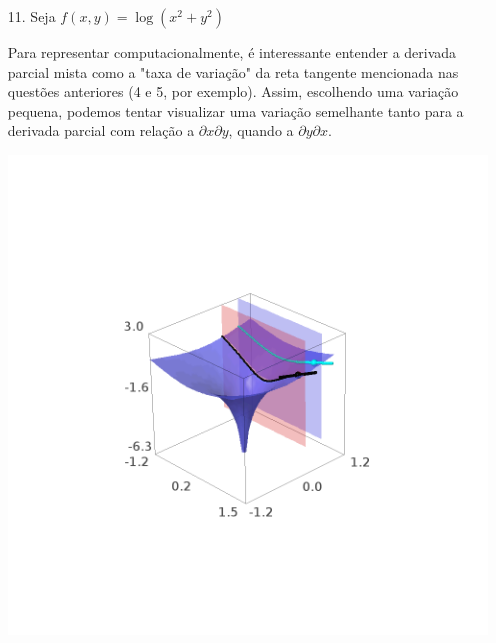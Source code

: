 \documentclass[../main.tex]{subfiles}
\begin{document}
\begin{solucao}
\begin{enumerate}[label=\arabic*.]
\begin{center}
\begin{minipage}{0.45\textwidth}
					\end{minipage}
				\end{center}
				\item[11.]
				Seja $f(x,y)=\log(x^2+y^2)$
				
				Para representar computacionalmente, é interessante entender a derivada parcial mista como a "taxa de variação" da reta tangente mencionada nas questões anteriores (4 e 5, por exemplo). Assim, escolhendo uma variação pequena, podemos tentar visualizar uma variação semelhante tanto para a derivada parcial com relação a $\partial x \partial y$, quando a $\partial y \partial x$.
				
				\begin{center}
					\begin{minipage}{0.45\textwidth}
						\centering
						\includegraphics[width=\textwidth]{imagens/lista04/picture_lista04.02_q01_item11.01.png}
					\end{minipage}
					\hfill
					\begin{minipage}{0.45\textwidth}
						\centering

\end{minipage}
\end{center}
\end{enumerate}
\end{solucao}
\end{document}

